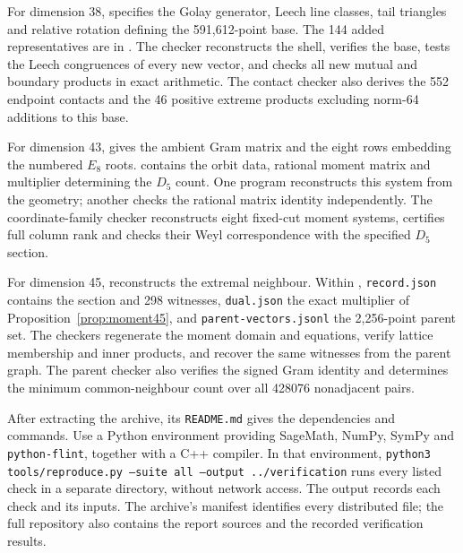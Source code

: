 For dimension 38,  specifies the Golay generator,
Leech line classes, tail triangles and relative rotation defining the
591,612-point base. The 144 added representatives are in
. The checker reconstructs the shell, verifies
the base, tests the Leech congruences of every new vector, and checks all
new mutual and boundary products in exact arithmetic.
The contact checker also derives the 552 endpoint contacts and the
46 positive extreme products excluding norm-64 additions to this base.

For dimension 43,  gives the
ambient Gram matrix and the eight rows embedding the numbered $E_8$ roots.
 contains the orbit data,
rational moment matrix and multiplier determining the $D_5$ count.
One program reconstructs this system from the geometry; another checks
the rational matrix identity independently.
The coordinate-family checker reconstructs eight fixed-cut moment
systems, certifies full column rank and checks their Weyl correspondence
with the specified $D_5$ section.

For dimension 45,  reconstructs the extremal neighbour.
Within , \texttt{record.json} contains the section
and 298 witnesses, \texttt{dual.json} the exact multiplier of
Proposition~\ref{prop:moment45}, and \texttt{parent-vectors.jsonl} the
2,256-point parent set. The checkers regenerate the moment domain and
equations, verify lattice membership and inner products, and recover
the same witnesses from the parent graph.
The parent checker also verifies the signed Gram identity and determines
the minimum common-neighbour count over all 428076 nonadjacent pairs.

After extracting the archive, its \texttt{README.md} gives the dependencies
and commands. Use a Python environment providing SageMath, NumPy, SymPy
and \texttt{python-flint}, together with a C++ compiler. In that environment,
\texttt{python3 tools/reproduce.py --suite all --output ../verification}
runs every listed check in a separate directory, without network access.
The output records each check and its inputs. The archive's manifest
identifies every distributed file; the full repository also contains
the report sources and the recorded verification results.
